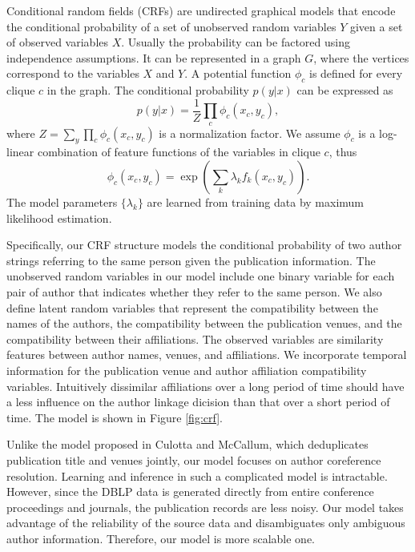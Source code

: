 \documentclass[twocolumn]{article}
\begin{document}
Conditional random fields (CRFs) are undirected graphical models that encode the conditional probability of a set of unobserved random variables $Y$ given a set of observed variables $X$.  Usually the probability can be factored using independence assumptions.  It can be represented in a graph $G$, where the vertices correspond to the variables $X$ and $Y$.  A potential function $\phi_c$ is defined for every clique $c$ in the graph.  The conditional probability $p(y|x)$ can be expressed as
$$p(y|x)=\frac{1}{Z}\prod_c \phi_c(x_c,y_c),$$
where $Z=\sum_y\prod_c \phi_c(x_c,y_c)$ is a normalization factor.  We assume $\phi_c$ is a log-linear combination of feature functions of the variables in clique $c$, thus
$$\phi_c(x_c,y_c)=\exp\left(\sum_k \lambda_k f_k(x_c,y_c)\right).$$
The model parameters $\{\lambda_k\}$ are learned from training data by maximum likelihood estimation.

Specifically, our CRF structure models the conditional probability of
two author strings referring to the same person given the publication
information.  The unobserved random variables in our model include one
binary variable for each pair of author that indicates whether they
refer to the same person.  We also define latent random variables that
represent the compatibility between the names of the authors, the
compatibility between the publication venues, and the compatibility
between their affiliations.  The observed variables are similarity
features between author names, venues, and affiliations.  We
incorporate temporal information for the publication venue and author
affiliation compatibility variables.  Intuitively dissimilar
affiliations over a long period of time should have a less influence
on the author linkage dicision than that over a short period of time.
The model is shown in Figure \ref{fig:crf}.

\begin{figure*}
\caption{Our CRF model for the author linkage problem}
\label{fig:crf}
\end{figure*}

Unlike the model proposed in Culotta and
McCallum\cite{Culotta05aconditional}, which deduplicates publication
title and venues jointly, our model focuses on author coreference
resolution.  Learning and inference in such a complicated model is
intractable.  However, since the DBLP data is generated directly from
entire conference proceedings and journals, the publication records
are less noisy.  Our model takes advantage of the
reliability of the source data and disambiguates only ambiguous author
information.  Therefore, our model is more scalable one.
\end{document}
